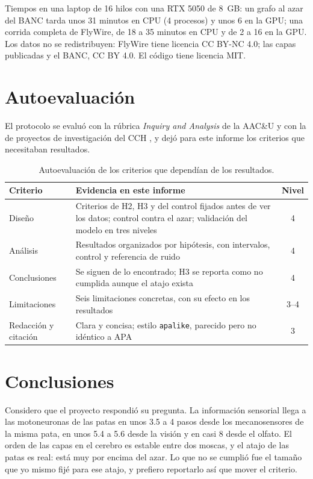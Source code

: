 \documentclass[11pt,letterpaper]{article}
\begin{document}
\noindent Tiempos en una laptop de 16 hilos con una RTX 5050 de 8~GB: un grafo al azar del BANC tarda unos 31 minutos en CPU (4 procesos) y unos 6 en la GPU; una corrida completa de FlyWire, de 18 a 35 minutos en CPU y de 2 a 16 en la GPU. Los datos no se redistribuyen: FlyWire tiene licencia CC BY-NC 4.0; las capas publicadas y el BANC, CC BY 4.0. El código tiene licencia MIT.

\section{Autoevaluación}

El protocolo se evaluó con la rúbrica \emph{Inquiry and Analysis} de la AAC\&U \citep{aacu2009} y con la de proyectos de investigación del CCH \citep{cchunam}, y dejó para este informe los criterios que necesitaban resultados.

\begin{table}[H]
\centering
\small
{}
\begin{tabularx}{\linewidth}{@{}p{3.1cm}Lc@{}}
\toprule
\textbf{Criterio} & \textbf{Evidencia en este informe} & \textbf{Nivel} \\
\midrule
Diseño & Criterios de H2, H3 y del control fijados antes de ver los datos; control contra el azar; validación del modelo en tres niveles & 4 \\
Análisis & Resultados organizados por hipótesis, con intervalos, control y referencia de ruido & 4 \\
Conclusiones & Se siguen de lo encontrado; H3 se reporta como no cumplida aunque el atajo exista & 4 \\
Limitaciones & Seis limitaciones concretas, con su efecto en los resultados & 3--4 \\
Redacción y citación & Clara y concisa; estilo \texttt{apalike}, parecido pero no idéntico a APA & 3 \\
\bottomrule
\end{tabularx}
\caption{Autoevaluación de los criterios que dependían de los resultados.}
\end{table}

\section{Conclusiones}

Considero que el proyecto respondió su pregunta. La información sensorial llega a las motoneuronas de las patas en unos 3.5 a 4 pasos desde los mecanosensores de la misma pata, en unos 5.4 a 5.6 desde la visión y en casi 8 desde el olfato. El orden de las capas en el cerebro es estable entre dos moscas, y el atajo de las patas es real: está muy por encima del azar. Lo que no se cumplió fue el tamaño que yo mismo fijé para ese atajo, y prefiero reportarlo así que mover el criterio.
\end{document}
